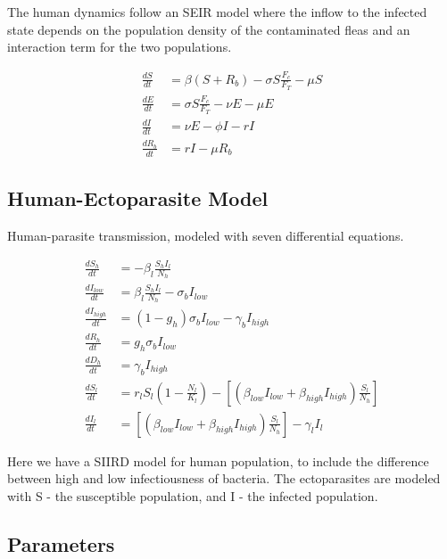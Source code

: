 \documentclass [letterpaper, 12pt] {article}
\begin{document}
The human dynamics follow an SEIR model where the inflow to the infected state depends on the
population density of the contaminated fleas and an interaction term for the two populations.

\begin{align}
	\frac{dS}{dt} &= \beta (S+R_b) - \sigma S \frac{F_c}{F_T} - \mu S \\
	\frac{dE}{dt} &= \sigma S \frac{F_c}{F_T} - \nu E - \mu E \\
	\frac{dI}{dt} &= \nu E - \phi I - rI \\
	\frac{dR_b}{dt} &= rI - \mu R_b
\end{align}



\subsection {Human-Ectoparasite Model}
Human-parasite transmission, modeled with seven differential equations.

\begin{equation}
	\begin{align*}
		\frac{dS_h}{dt} &= -\beta_l \frac{S_h I_l}{N_h} \\
		\frac{dI_{low}}{dt} &= \beta_l \frac{S_h I_l}{N_h} - \sigma_b I_{low} \\
		\frac{dI_{high}}{dt} &= (1-g_h) \sigma_b I_{low} - \gamma_b I_{high} \\
		\frac{dR_h}{dt} &= g_h \sigma_b I_{low} \\
		\frac{dD_h}{dt} &= \gamma_b I_{high} \\
		\frac{dS_l}{dt} &= r_l S_l \left( 1 - \frac{N_l}{K_l} \right) - \left[ \left( \beta_{low} I_{low} + \beta_{high} I_{high} \right) \frac{S_l}{N_h} \right] \\
		\frac{dI_l}{dt} &= \left[ \left( \beta_{low} I_{low} + \beta_{high} I_{high} \right) \frac{S_l}{N_h} \right] - \gamma_l I_l
	\end{align*}
\end{equation}

Here we have a SIIRD model for human population, to include the difference between high and low infectiousness of bacteria.
The ectoparasites are modeled with S - the susceptible population, and I - the infected population.

\pagebreak

\subsection{Parameters}
\end{document}
